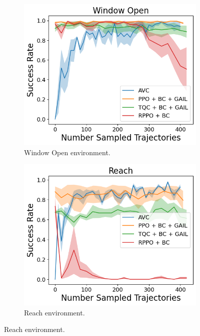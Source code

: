 \begin{figure}[htbp]
    \centering
    \begin{subfigure}[b]{0.45\textwidth}
      \includegraphics[width=\textwidth]{images/15_400/Window Open.png}
      \caption{Window Open environment.}
    \end{subfigure}
    \hfill
    \begin{subfigure}[b]{0.45\textwidth}
      \includegraphics[width=\textwidth]{images/15_400/Reach.png}
      \caption{Reach environment.}
    \end{subfigure}
    \medskip

\end{figure}
